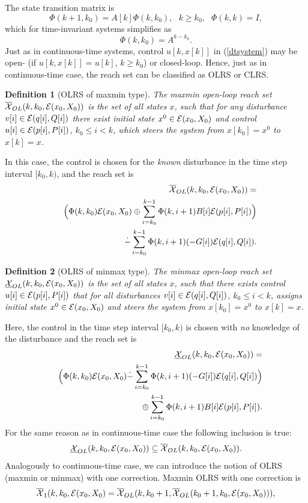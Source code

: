 \documentclass{report}
\newtheorem{df}{Definition}[section]
\newcommand{\bd}{\begin{df}}
\newcommand{\ed}{\end{df}}
\newcommand{\EE}{{\cal E}}
\newcommand{\XX}{{\cal X}}
\begin{document}
The state transition matrix is
\[ \Phi(k+1,k_{0})=A[k]\Phi(k,k_{0}), ~~~ k\geq k_0, ~~~ \Phi(k,k)=I, \]
which for time-invariant systems simplifies as
\[ \Phi(k,k_{0})=A^{k-k_0}. \]
Just as in continuous-time systems, control $u[k, x[k]]$ in (\ref{dtsystem})
may be open- (if $u[k,x[k]] = u[k]$, $k\geq k_0$) or closed-loop.
Hence, just as in continuous-time case, the reach set can be classified as
OLRS or CLRS.
\bd[OLRS of maxmin type]
The maxmin open-loop reach set $\overline{\XX}_{OL}(k,k_0,\EE(x_0,X_0))$ is the set
of all states $x$, such that for any disturbance $v[i]\in\EE(q[i],Q[i])$ there
exist initial state $x^0\in\EE(x_0,X_0)$ and control $u[i]\in\EE(p[i],P[i])$,
$k_0\leq i<k$, which steers the system from $x[k_0]=x^0$ to $x[k]=x$.
\ed
In this case, the control is chosen for the \emph{known} disturbance in the
time step interval $[k_0, k)$, and the reach set is
\begin{eqnarray}
& & \overline{\XX}_{OL}(k,k_0,\EE(x_0,X_0)) = \nonumber \\
& & \Big{(}\Phi(k,k_0)\EE(x_0,X_0)\oplus
\sum_{i=k_0}^{k-1}\Phi(k,i+1)B[i]\EE(p[i],P[i])\Big{)} \nonumber \\
& & \dot{-} \sum_{i=k_0}^{k-1}\Phi(k,i+1)(-G[i])\EE(q[i],Q[i]).
\end{eqnarray}
\bd[OLRS of minmax type]
The minmax open-loop reach set $\underline{\XX}_{OL}(k,k_0,\EE(x_0,X_0))$ is the set
of all states $x$, such that there exists control $u[i]\in\EE(p[i],P[i])$ that
for all disturbances $v[i]\in\EE(q[i],Q[i])$, $k_0\leq i<k$, assigns initial
state $x^0\in\EE(x_0,X_0)$ and steers the system from $x[k_0]=x^0$ to
$x[k]=x$.
\ed
Here, the control in the time step interval $[k_0,k)$ is chosen with \emph{no}
knowledge of the disturbance and the reach set is
\begin{eqnarray}
& & \underline{\XX}_{OL}(k,k_0,\EE(x_0,X_0)) = \nonumber \\
& & \Big{(}\Phi(k,k_0)\EE(x_0,X_0)\dot{-}
\sum_{i=k_0}^{k-1}\Phi(k,i+1)(-G[i])\EE(q[i],Q[i])\Big{)} \nonumber \\
& & \oplus
\sum_{i=k_0}^{k-1}\Phi(k,i+1)B[i]\EE(p[i],P[i]).
\end{eqnarray}
For the same reason as in continuous-time case the following inclusion is true:
\[ \underline{\XX}_{OL}(k,k_0,\EE(x_0,X_0)) \subseteq
\overline{\XX}_{OL}(k,k_0,\EE(x_0,X_0)) . \]
Analogously to continuous-time case, we can introduce the notion of OLRS
(maxmin or minmax) with one correction. Maxmin OLRS with one correction is
\[ \overline{\XX}_1(k,k_0,\EE(x_0,X_0) =
\overline{\XX}_{OL}(k,k_0+1,\overline{\XX}_{OL}(k_0+1,k_0,\EE(x_0,X_0))), \]
\end{document}

